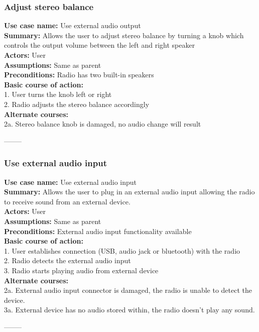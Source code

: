 \documentclass[11pt]{article}
\begin{document}
\subsubsection{Adjust stereo balance}
\textbf{Use case name:} Use external audio output\\
\textbf{Summary:} Allows the user to adjust stereo balance by turning a knob which controls the output volume between the left and right speaker\\
\textbf{Actors:} User\\
\textbf{Assumptions:} Same as parent\\
\textbf{Preconditions:} Radio has two built-in speakers\\
\textbf{Basic course of action:}\\
\hspace*{10mm}1. User turns the knob left or right\\
\hspace*{10mm}2. Radio adjusts the stereo balance accordingly\\
\textbf{Alternate courses:}\\
\hspace*{10mm}2a. Stereo balance knob is damaged, no audio change will result
\begin{center}--------\end{center}

\subsubsection{Use external audio input}
\textbf{Use case name:} Use external audio input\\
\textbf{Summary:} Allows the user to plug in an external audio input allowing the radio to receive sound from an external device.\\
\textbf{Actors:} User\\
\textbf{Assumptions:} Same as parent\\
\textbf{Preconditions:} External audio input functionality available\\
\textbf{Basic course of action:}\\
\hspace*{10mm}1. User establishes connection (USB, audio jack or bluetooth) with the radio\\
\hspace*{10mm}2. Radio detects the external audio input\\
\hspace*{10mm}3. Radio starts playing audio from external device\\
\textbf{Alternate courses:}\\
\hspace*{10mm}2a. External audio input connector is damaged, the radio is unable to detect the device.\\
\hspace*{10mm}3a. External device has no audio stored within, the radio doesn't play any sound.\\
\begin{center}--------\end{center}
\end{document}
